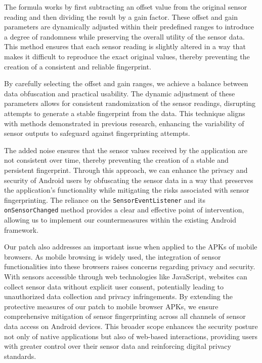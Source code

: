 \documentclass[11pt,
  oneside,openany,    %
]{scrreprt}
\begin{document}
The formula works by first subtracting an offset value from the original sensor reading and then dividing the result by a gain factor.
These offset and gain parameters are dynamically adjusted within their predefined ranges to introduce a degree of randomness while preserving the overall utility of the sensor data.
This method ensures that each sensor reading is slightly altered in a way that makes it difficult to reproduce the exact original values, thereby preventing the creation of a consistent and reliable fingerprint.

By carefully selecting the offset and gain ranges, we achieve a balance between data obfuscation and practical usability.
The dynamic adjustment of these parameters allows for consistent randomization of the sensor readings, disrupting attempts to generate a stable fingerprint from the data.
This technique aligns with methods demonstrated in previous research, enhancing the variability of sensor outputs to safeguard against fingerprinting attempts.

The added noise ensures that the sensor values received by the application are not consistent over time, thereby preventing the creation of a stable and persistent fingerprint.
Through this approach, we can enhance the privacy and security of Android users by obfuscating the sensor data in a way that preserves the application's functionality while mitigating the risks associated with sensor fingerprinting.
The reliance on the \verb|SensorEventListener| and its \verb|onSensorChanged| method provides a clear and effective point of intervention, allowing us to implement our countermeasures within the existing Android framework.

Our patch also addresses an important issue when applied to the APKs of mobile browsers.
As mobile browsing is widely used, the integration of sensor functionalities into these browsers raises concerns regarding privacy and security.
With sensors accessible through web technologies like JavaScript, websites can collect sensor data without explicit user consent, potentially leading to unauthorized data collection and privacy infringements.
By extending the protective measures of our patch to mobile browser APKs, we ensure comprehensive mitigation of sensor fingerprinting across all channels of sensor data access on Android devices.
This broader scope enhances the security posture not only of native applications but also of web-based interactions, providing users with greater control over their sensor data and reinforcing digital privacy standards.
\end{document}
